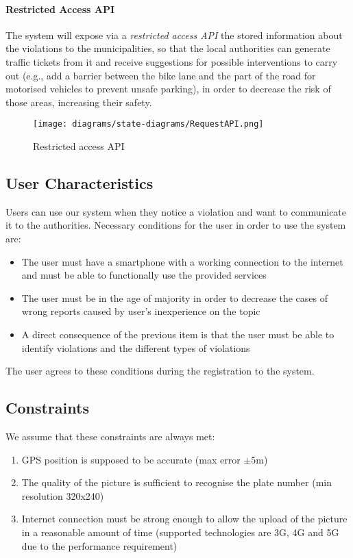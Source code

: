 \paragraph{Restricted Access API}
The system will expose via a \emph{restricted access API} the stored information about the violations to the municipalities, so that the local authorities can generate traffic tickets from it and receive suggestions for possible interventions to carry out (e.g., add a barrier between the bike lane and the part of the road for motorised vehicles to prevent unsafe parking), in order to decrease the risk of those areas, increasing their safety. \cite{Assignments} \newline
	\begin{figure}[h]
		\centering
		\texttt{[image: diagrams/state-diagrams/RequestAPI.png]}
		\caption{
			\label{fig:restrictedAPI} Restricted access API
		}
	\end{figure}


\subsection{User Characteristics}
	Users can use our system when they notice a violation and want to communicate it to the authorities. Necessary conditions for the user in order to use the system are:
 	\begin{itemize}
 		\item The user must have a smartphone with a working connection to the internet and must be able to functionally use the provided services
 		\item The user must be in the age of majority in order to decrease the cases of wrong reports caused by user's inexperience on the topic 
 		\item A direct consequence of the previous item is that the user must be able to identify violations and the different types of violations
 	\end{itemize}
 	The user agrees to these conditions during the registration to the system.
 	
\subsection{Constraints}
\label{sec:constraints}
	We assume that these constraints are always met:
	\begin{enumerate}[label=\textbf{C\arabic*}]
		\item \label{constraint:accurateGPS} GPS position is supposed to be accurate (max error $\pm5$m)
		\item \label{constraint:pictureQuality} The quality of the picture is sufficient to recognise the plate number (min resolution 320x240)
		\item \label{constraint:strongConnection} Internet connection must be strong enough to allow the upload of the picture in a reasonable amount of time (supported technologies are 3G, 4G and 5G due to the performance requirement)
	\end{enumerate}
	
